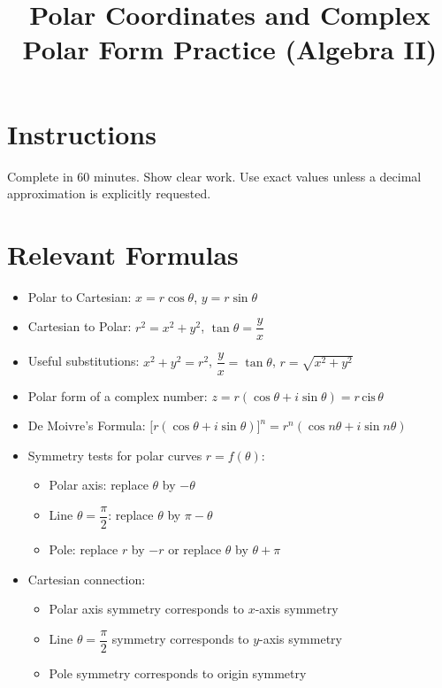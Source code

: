 \documentclass[12pt]{article}
\title{Polar Coordinates and Complex Polar Form Practice (Algebra II)}
\author{}
\date{}
\begin{document}
\maketitle

\section*{Instructions}
Complete in 60 minutes. Show clear work. Use exact values unless a decimal approximation is explicitly requested.

\section*{Relevant Formulas}
\begin{itemize}[leftmargin=1.5em]
  \item Polar to Cartesian: $x=r\cos\theta$, $y=r\sin\theta$
  \item Cartesian to Polar: $r^2=x^2+y^2$, $\tan\theta=\dfrac{y}{x}$
  \item Useful substitutions: $x^2+y^2=r^2$, $\dfrac{y}{x}=\tan\theta$, $r=\sqrt{x^2+y^2}$
  \item Polar form of a complex number: $z=r(\cos\theta+i\sin\theta)=r\,\text{cis}\,\theta$
  \item De Moivre's Formula: $\big[r(\cos\theta+i\sin\theta)\big]^n=r^n(\cos n\theta+i\sin n\theta)$
  \item Symmetry tests for polar curves $r=f(\theta)$:
  \begin{itemize}[leftmargin=1.5em]
    \item Polar axis: replace $\theta$ by $-\theta$
    \item Line $\theta=\dfrac{\pi}{2}$: replace $\theta$ by $\pi-\theta$
    \item Pole: replace $r$ by $-r$ or replace $\theta$ by $\theta+\pi$
  \end{itemize}
  \item Cartesian connection:
  \begin{itemize}[leftmargin=1.5em]
    \item Polar axis symmetry corresponds to $x$-axis symmetry
    \item Line $\theta=\dfrac{\pi}{2}$ symmetry corresponds to $y$-axis symmetry
    \item Pole symmetry corresponds to origin symmetry
  \end{itemize}
\end{itemize}
\end{document}
